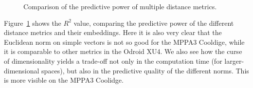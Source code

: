 \begin{figure}[h]
	\centering
   \resizebox{0.75\textwidth}{!}{}
	\caption{Comparison of the predictive power of multiple distance metrics.}
	\label{fig:metric_regression}
\end{figure}

Figure~\ref{fig:metric_regression} shows the $R^2$ value, comparing the predictive power of the different distance metrics and their embeddings.
Here it is also very clear that the Euclidean norm on simple vectors is not so good for the MPPA3 Cooldige, while it is comparable to other metrics in the Odroid XU4.
We also see how the curse of dimensionality yields a trade-off not only in the computation time (for larger-dimensional spaces), but also in the predictive quality of the different norms.
This is more visible on the MPPA3 Coolidge.